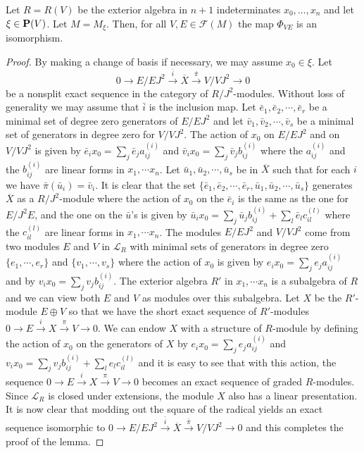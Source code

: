 \documentclass[10pt]{amsart}
\begin{document}
\begin{lemma}\label{lifting exact sequences} Let $R=R(V)$ be the exterior algebra 
in $n+1$ indeterminates $x_0,\ldots ,x_n$ 
and let $\xi \in {\bf P}(V)$. Let $M=M_{\xi}$. 
Then, for all $V,E\in\mathcal F(M)$ the map $\Phi_{VE}$ is an isomorphism. 
\end{lemma}
\begin{proof} By making a change of basis if necessary, we may assume 
$x_0\in \xi$.
Let 
$$0\rightarrow E/{EJ^2}\stackrel{\bar i}\longrightarrow\overline{X}
\stackrel{\bar\pi}\longrightarrow V/{VJ^2}\rightarrow 0$$
\noindent be a nonsplit exact sequence in the category of 
$R/{J^2}$-modules. Without loss of generality we may 
assume that $\bar i$ is the inclusion map. Let $\bar{e}_1, \bar{e}_2,\cdots, \bar{e}_r$ 
be a minimal set of degree zero generators of
$E/{EJ^2}$ and let $\bar{v}_1, \bar{v}_2,\cdots, \bar{v}_s$ be a minimal 
set of generators in degree zero for $V/{VJ^2}$. The action of $x_0$ on $E/{EJ^2}$ 
and on $V/{VJ^2}$ is given by 
$\bar{e}_ix_0=\sum_j \bar{e}_ja^{(i)}_{ij}$ and $\bar{v}_ix_0=\sum_j\bar{v}_j b^{(i)}_{ij}$ 
where the $a^{(i)}_{ij}$ and the $b^{(i)}_{ij}$ are linear forms in $x_1,\cdots x_n$. 
Let $\bar{u}_1, \bar{u}_2,\cdots, \bar{u}_s$
 be in $\overline{X}$ such that for each $i$ we have $\bar\pi(\bar{u}_i)=\bar{v}_i$.  
It is clear that the set 
$\{\bar{e}_1, \bar{e}_2,\cdots, \bar{e}_r, \bar{u}_1, \bar{u}_2,\cdots, \bar{u}_s\}$ 
generates $\overline X$ as a $R/{J^2}$-module where the 
action of $x_0$ on the $\bar{e}_i$ is the same as the one for $E/{J^2E}$, 
and the one on the $\bar{u}$'s  is given by  
$\bar{u}_ix_0=\sum_j\bar{u}_jb^{(i)}_{ij}+\sum_l \bar{e}_lc^{(l)}_{il}$ 
where the $c^{(l)}_{il}$ are linear forms in 
$x_1,\cdots x_n$. The modules $E/{EJ^2}$ and $V/{VJ^2}$ come from 
two modules $E$ and $V$ in $\mathcal L_R$ with minimal sets of 
generators in degree zero 
$\{e_1,\cdots, e_r\}$ and $\{v_1,\cdots, v_s\}$ where the action of 
$x_0$ is given by $ e_ix_0=\sum_je_j a^{(i)}_{ij}$ and by 
$ v_ix_0=\sum_j v_jb^{(i)}_{ij}$. The exterior algebra 
$R'$ in $x_1,\cdots x_n$ is a subalgebra of $R$ and we can view 
both $E$ and $V$ as modules over this subalgebra. Let $X$ be the $R'$-module 
$E\oplus V$ so that we have the short exact sequence of $R'$-modules 
$0\rightarrow E\stackrel{i}\rightarrow X\stackrel{\pi}\rightarrow V\rightarrow 0$. 
We can endow $X$ with a structure of $R$-module by defining the 
action of $x_0$ on the generators of $X$ by $ e_ix_0=\sum_j e_ja^{(i)}_{ij}$ 
and  $v_ix_0=\sum_jv_j b^{(i)}_{ij}+\sum_le_lc^{(l)}_{il}$ and it is easy 
to see that with this action, the sequence 
$0\rightarrow E\stackrel{i}\rightarrow X\stackrel{\pi}\rightarrow V\rightarrow 0$ 
becomes an exact sequence of graded $R$-modules. Since $\mathcal L_R$ is closed 
under extensions, the module $X$ also has a linear presentation. It is now clear 
that modding out the square of the radical yields an exact sequence isomorphic 
to
$0\rightarrow E/{EJ^2}\stackrel{\bar i}\longrightarrow \overline{X}\stackrel{\bar\pi}
\longrightarrow V/{VJ^2}\rightarrow 0$ 
and this completes the proof of the lemma.
\end{proof}
\end{document}
